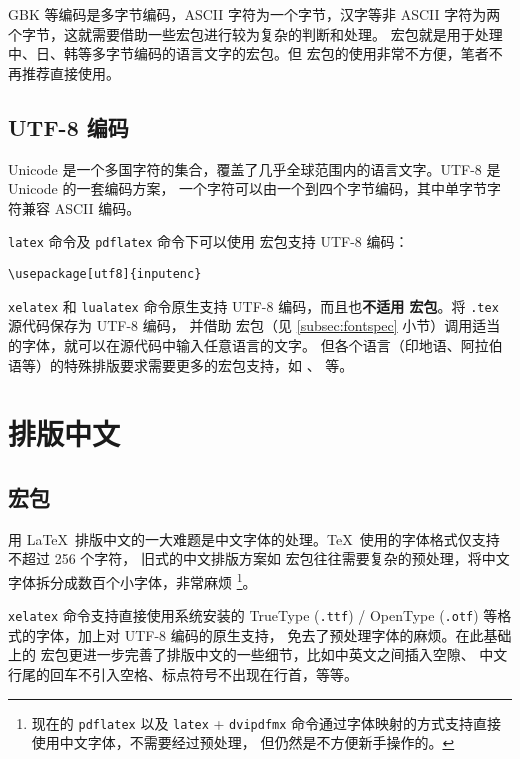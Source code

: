 GBK 等编码是多字节编码，ASCII 字符为一个字节，汉字等非 ASCII 字符为两个字节，这就需要借助一些宏包进行较为复杂的判断和处理。
 宏包就是用于处理中、日、韩等多字节编码的语言文字的宏包。但  宏包的使用非常不方便，笔者不再推荐直接使用。

\subsection{UTF-8 编码}\label{subsec:utf8}

Unicode 是一个多国字符的集合，覆盖了几乎全球范围内的语言文字。UTF-8 是 Unicode 的一套编码方案，
一个字符可以由一个到四个字节编码，其中单字节字符兼容 ASCII 编码。

\texttt{latex} 命令及 \texttt{pdflatex} 命令下可以使用  宏包支持 UTF-8 编码：
\begin{verbatim}
\usepackage[utf8]{inputenc}
\end{verbatim}

\texttt{xelatex} 和 \texttt{lualatex} 命令原生支持 UTF-8 编码，而且也\textbf{不适用  宏包}。将 \texttt{.tex} 源代码保存为 UTF-8 编码，
并借助  宏包（见 \ref{subsec:fontspec} 小节）调用适当的字体，就可以在源代码中输入任意语言的文字。
但各个语言（印地语、阿拉伯语等）的特殊排版要求需要更多的宏包支持，如 、  等。

\section{排版中文}\label{sec:chinese}

\subsection{ 宏包}\label{subsec:xeCJK}

用 \LaTeX\ 排版中文的一大难题是中文字体的处理。\TeX\ 使用的字体格式仅支持不超过 256 个字符，
旧式的中文排版方案如  宏包往往需要复杂的预处理，将中文字体拆分成数百个小字体，非常麻烦%
\footnote{现在的 \texttt{pdflatex} 以及 \texttt{latex} + \texttt{dvipdfmx} 命令通过字体映射的方式支持直接使用中文字体，不需要经过预处理，
但仍然是不方便新手操作的。}。

\texttt{xelatex} 命令支持直接使用系统安装的 TrueType (\texttt{.ttf}) / OpenType (\texttt{.otf}) 等格式的字体，加上对 UTF-8 编码的原生支持，
免去了预处理字体的麻烦。在此基础上的  宏包更进一步完善了排版中文的一些细节，比如中英文之间插入空隙、
中文行尾的回车不引入空格、标点符号不出现在行首，等等。

